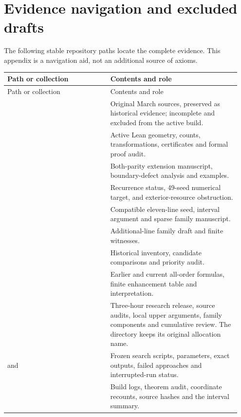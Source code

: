 

\section{Evidence navigation and excluded drafts}\label{app:evidence}

The following stable repository paths locate the complete evidence. This appendix is a navigation aid, not an additional source of axioms.
\begin{longtable}{@{}P{0.42\linewidth}P{0.53\linewidth}@{}}
\toprule Path or collection & Contents and role\\\midrule\endfirsthead
\toprule Path or collection & Contents and role\\\midrule\endhead
\bottomrule\endfoot
{} & Original March sources, preserved as historical evidence; incomplete and excluded from the active build.\\
 & Active Lean geometry, counts, transformations, certificates and formal proof audit.\\
 & Both-parity extension manuscript, boundary-defect analysis and examples.\\
 & Recurrence status, 49-seed numerical target, and exterior-resource obstruction.\\
 & Compatible eleven-line seed, interval argument and sparse family manuscript.\\
 & Additional-line family draft and finite witnesses.\\
 & Historical inventory, candidate comparisons and priority audit.\\
 & Earlier and current all-order formulas, finite enhancement table and interpretation.\\
 & Three-hour research release, source audits, local upper arguments, family components and cumulative review. The directory keeps its original allocation name.\\
 and  & Frozen search scripts, parameters, exact outputs, failed approaches and interrupted-run status.\\
 & Build logs, theorem audit, coordinate recounts, source hashes and the interval summary.\\

\end{longtable}
